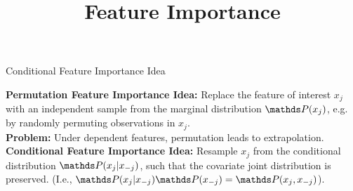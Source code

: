 \documentclass[11pt,compress,t,notes=noshow, xcolor=table]{beamer}
\title{Feature Importance}
\institute{\href{https://compstat-lmu.github.io/lecture_i2ml/}{compstat-lmu.github.io/lecture\_i2ml}}
\date{}
\begin{document}
	
	
	
	
	
	
	
	
	
	



\begin{vbframe}{Conditional Feature Importance Idea}

\textbf{Permutation Feature Importance Idea:} Replace the feature of interest $x_j$ with an independent sample from the marginal distribution $\P(x_j)$, e.g. by randomly permuting observations in $x_j$.\\
\lz
\textbf{Problem:} Under dependent features, permutation leads to extrapolation.\\
\lz
\textbf{Conditional Feature Importance Idea:} Resample $x_j$ from the conditional distribution $\P(x_j|x_{-j})$, such that the covariate joint distribution is preserved. (I.e., $\P(x_j|x_{-j}) \P(x_{-j}) = \P(x_j, x_{-j})$).

\end{vbframe}
\end{document}
